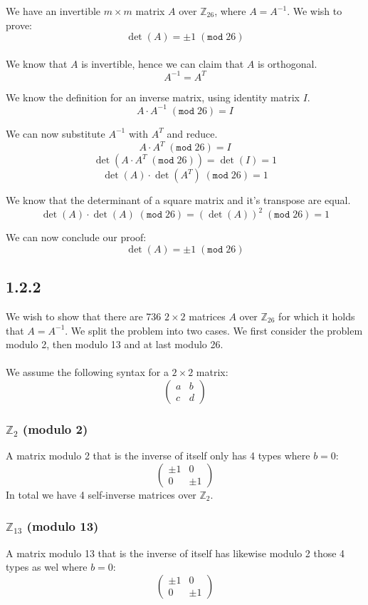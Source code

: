 \documentclass[11pt]{report}
\begin{document}
We have an invertible $m \times m$ matrix $A$ over $\mathbb{Z}_{26}$, where $A = A^{-1}$. We wish to prove:
$$\det(A) = \pm 1\;(\mathtt{mod}\;26)$$
\\
We know that $A$ is invertible, hence we can claim that $A$ is orthogonal.
$$A^{-1}=A^T$$

We know the definition for an inverse matrix, using identity matrix $I$.
$$A \cdot A^{-1}\;(\mathtt{mod}\;26) = I$$

We can now substitute $A^{-1}$ with $A^T$ and reduce.
$$A \cdot A^T\;(\mathtt{mod}\;26)= I$$
$$\det(A \cdot A^T\;(\mathtt{mod}\;26)) = \det(I) = 1$$
$$\det(A) \cdot \det(A^T)\;(\mathtt{mod}\;26) = 1$$

We know that the determinant of a square matrix and it's transpose are equal.
$$\det(A) \cdot \det(A)\;(\mathtt{mod}\;26) = (\det(A))^2\;(\mathtt{mod}\;26) = 1$$

We can now conclude our proof:
$$\det(A) = \pm 1\;(\mathtt{mod}\;26)$$

\newpage

\subsection*{1.2.2}
We wish to show that there are 736 $2 \times 2$ matrices $A$ over $\mathbb{Z}_{26}$ for which it holds that $A= A^{-1}$. We split the problem into two cases. We first consider the problem modulo 2, then modulo 13 and at last modulo 26.\\
\\
We assume the following syntax for a $2 \times 2$ matrix:
$$\begin{pmatrix}
a & b\\
c & d
\end{pmatrix}$$

\subsubsection*{$\mathbb{Z}_{2}$ (modulo 2)}
A matrix modulo 2 that is the inverse of itself only has 4 types where $b = 0$:
$$\begin{pmatrix}
\pm 1 & 0\\
0 & \pm 1
\end{pmatrix}$$
In total we have 4 self-inverse matrices over $\mathbb{Z}_{2}$.

\subsubsection*{$\mathbb{Z}_{13}$ (modulo 13)}
A matrix modulo 13 that is the inverse of itself has likewise modulo 2 those 4 types as wel where $b = 0$:\\
$$\begin{pmatrix}
\pm 1 & 0\\
0 & \pm 1
\end{pmatrix}$$
\end{document}
